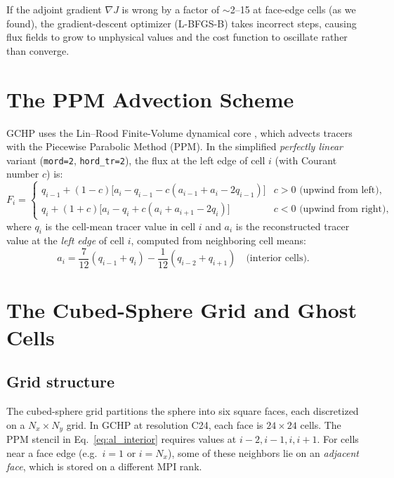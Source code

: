 \documentclass[11pt]{article}
\begin{document}
If the adjoint gradient $\nabla J$ is wrong by a factor of $\sim$2--15 at
face-edge cells (as we found), the gradient-descent optimizer (L-BFGS-B)
takes incorrect steps, causing flux fields to grow to unphysical values and
the cost function to oscillate rather than converge.

\section{The PPM Advection Scheme}

GCHP uses the Lin--Rood Finite-Volume dynamical core \citep{lin1996,putman2007},
which advects tracers with the Piecewise Parabolic Method (PPM). In the
simplified \emph{perfectly linear} variant (\texttt{mord=2}, \texttt{hord\_tr=2}),
the flux at the left edge of cell $i$ (with Courant number $c$) is:
\begin{equation}
  F_i =
  \begin{cases}
    q_{i-1} + (1-c)\bigl[a_i - q_{i-1} - c(a_{i-1}+a_i - 2q_{i-1})\bigr]
    & c > 0 \text{ (upwind from left)}, \\[6pt]
    q_i + (1+c)\bigl[a_i - q_i + c(a_i+a_{i+1} - 2q_i)\bigr]
    & c < 0 \text{ (upwind from right)},
  \end{cases}
  \label{eq:ppm_flux}
\end{equation}
where $q_i$ is the cell-mean tracer value in cell $i$ and $a_i$ is the
reconstructed tracer value at the \emph{left edge} of cell $i$, computed
from neighboring cell means:
\begin{equation}
  a_i = \frac{7}{12}(q_{i-1}+q_i) - \frac{1}{12}(q_{i-2}+q_{i+1})
  \quad \text{(interior cells)}.
  \label{eq:al_interior}
\end{equation}

\section{The Cubed-Sphere Grid and Ghost Cells}

\subsection{Grid structure}

The cubed-sphere grid partitions the sphere into six square faces, each
discretized on a $N_x \times N_y$ grid. In GCHP at resolution C24, each
face is $24 \times 24$ cells. The PPM stencil in Eq.~\eqref{eq:al_interior}
requires values at $i-2, i-1, i, i+1$. For cells near a face edge (e.g.\
$i=1$ or $i=N_x$), some of these neighbors lie on an \emph{adjacent face},
which is stored on a different MPI rank.
\end{document}
